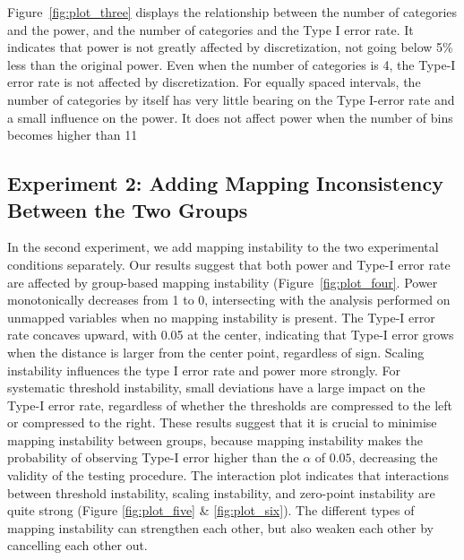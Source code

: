 \documentclass[titlepage, a4paper, 11pt]{article}
\begin{document}
Figure~\ref{fig:plot_three} displays the relationship between the number of categories and the power, and the number of categories and the Type I error rate. It indicates that power is not greatly affected by discretization, not going below 5\% less than the original power. Even when the number of categories is 4, the Type-I error rate is not affected by discretization. For equally spaced intervals, the number of categories by itself has very little bearing on the Type I-error rate and a small influence on the power. It does not affect power when the number of bins becomes higher than 11

\subsection{Experiment 2: Adding Mapping Inconsistency Between the Two Groups}
In the second experiment, we add mapping instability to the two experimental conditions separately. Our results suggest that both power and Type-I error rate are affected by group-based mapping instability (Figure~\ref{fig:plot_four}. Power monotonically decreases from 1 to 0, intersecting with the analysis performed on unmapped variables when no mapping instability is present. The Type-I error rate concaves upward, with 0.05 at the center, indicating that Type-I error grows when the distance is larger from the center point, regardless of sign. Scaling instability influences the type I error rate and power more strongly. For systematic threshold instability, small deviations have a large impact on the Type-I error rate, regardless of whether the thresholds are compressed to the left or compressed to the right. These results suggest that it is crucial to minimise mapping instability between groups, because mapping instability makes the probability of observing Type-I error higher than the $\alpha$ of $0.05$, decreasing the validity of the testing procedure. The interaction plot indicates that interactions between threshold instability, scaling instability, and zero-point instability are quite strong (Figure \ref{fig:plot_five} \& \ref{fig:plot_six}). The different types of mapping instability can strengthen each other, but also weaken each other by cancelling each other out. 
\end{document}
